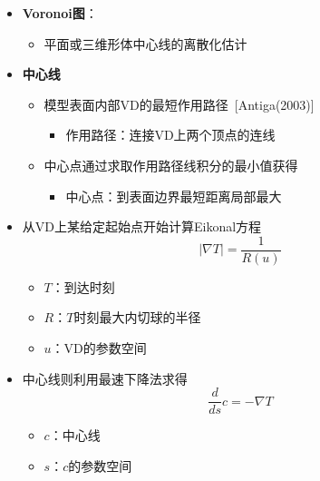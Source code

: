 \begin{frame}
\begin{itemize}
\item \textbf{Voronoi图}：
\begin{itemize}
\item 平面或三维形体中心线的离散化估计
\end{itemize}
\item \textbf{中心线}
\begin{itemize}
\item 模型表面内部VD的最短作用路径~[Antiga(2003)]
\begin{itemize}
\item \alert{作用路径}：连接VD上两个顶点的连线
\end{itemize}
\item 中心点通过求取作用路径线积分的最小值获得
\begin{itemize}
\item \alert{中心点}：到表面边界最短距离局部最大
\end{itemize}
\end{itemize}
\end{itemize}
\end{frame}

\begin{frame}
\begin{itemize}
\item 从VD上某给定起始点开始计算Eikonal方程
\begin{equation*}
\left| \nabla T \right| = \frac{1}{R(u)}
\end{equation*}
\begin{itemize}
\item $T$：到达时刻
\item $R$：$T$时刻最大内切球的半径
\item $u$：VD的参数空间
\end{itemize}
\item 中心线则利用最速下降法求得
\begin{equation*}
\frac{d}{ds} c = - \nabla T
\end{equation*}
\begin{itemize}
\item $c$：中心线
\item $s$：$c$的参数空间
\end{itemize}
\end{itemize}
\end{frame}

